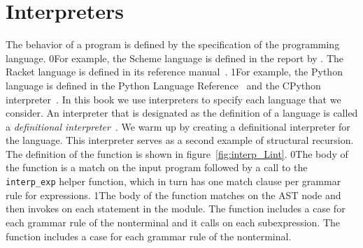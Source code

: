 \documentclass[7x10]{TimesAPriori_MIT}%
\def\racketEd{0}
\def\pythonEd{1}
\def\edition{0}
\newcommand{\racket}[1]{{\if\edition\racketEd{#1}\fi}}
\newcommand{\python}[1]{{\if\edition\pythonEd #1\fi}}
\numberwithin{theorem}{chapter}
\numberwithin{definition}{chapter}
\numberwithin{equation}{chapter}
\begin{document}
\section{Interpreters}
\label{sec:interp_Lint}

The behavior of a program is defined by the specification of the
programming language.
%
\racket{For example, the Scheme language is defined in the report by
  \citet{SPERBER:2009aa}. The Racket language is defined in its
  reference manual~\citep{plt-tr}.}
%
\python{For example, the Python language is defined in the Python
  Language Reference~\citep{PSF21:python_ref} and the CPython interpreter~\citep{PSF21:cpython}.}
%
In this book we use interpreters to specify each language that we
consider. An interpreter that is designated as the definition of a
language is called a \emph{definitional
  interpreter}~\citep{reynolds72:_def_interp}.
 We warm up by creating a
definitional interpreter for the \LangInt{} language. This interpreter
serves as a second example of structural recursion. The definition of the
 function is shown in
figure~\ref{fig:interp_Lint}.
%
\racket{The body of the function is a match on the input program
  followed by a call to the \lstinline{interp_exp} helper function,
  which in turn has one match clause per grammar rule for \LangInt{}
  expressions.}
%
\python{The body of the function matches on the  AST node
  and then invokes \code{interp\_stmt} on each statement in the
  module.  The \code{interp\_stmt} function includes a case for each
  grammar rule of the \Stmt{} nonterminal and it calls
  \code{interp\_exp} on each subexpression.  The \code{interp\_exp}
  function includes a case for each grammar rule of the \Exp{}
  nonterminal.}
\end{document}
